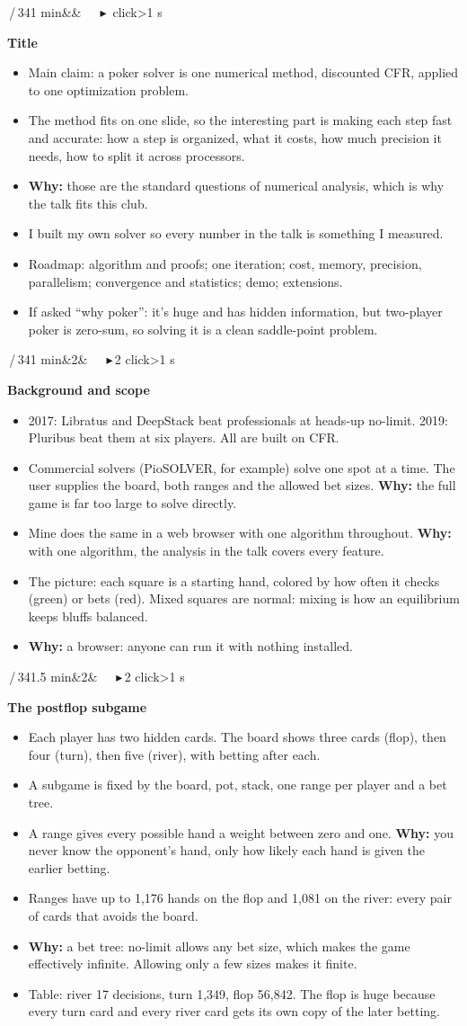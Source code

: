 \documentclass{article}
\newcommand{\slide}[4]{\clearpage
  \noindent\colorbox{bar}{\parbox{\dimexpr\linewidth-2\fboxsep}{\color{white}\fontsize{13}{15}\selectfont
  \textbf{\fontsize{21}{23}\selectfont #1}\,/\,34\hfill #3\ifx&#4&\else\ \ \ \textcolor{ck!40!white}{\ensuremath{\blacktriangleright}}\,#4 click\ifnum#4>1 s\fi\fi\\[2pt]
  \raggedright\textbf{\fontsize{15}{17.5}\selectfont #2}}}\par\vspace{5pt}
  \fontsize{15}{17.8}\selectfont\raggedright}
\newcommand{\pt}{\item[\textbullet]}
\newcommand{\ck}{\item[\textcolor{ck}{\ensuremath{\blacktriangleright}}]}
\newcommand{\why}{\textcolor{why}{\textbf{Why:}} }
\begin{document}
\slide{1}{Title}{1 min}{}
\begin{itemize}
\pt Main claim: a poker solver is one numerical method, discounted CFR, applied to one optimization problem.
\pt The method fits on one slide, so the interesting part is making each step fast and accurate: how a step is organized, what it costs, how much precision it needs, how to split it across processors.
\pt \why those are the standard questions of numerical analysis, which is why the talk fits this club.
\pt I built my own solver so every number in the talk is something I measured.
\pt Roadmap: algorithm and proofs; one iteration; cost, memory, precision, parallelism; convergence and statistics; demo; extensions.
\pt If asked ``why poker'': it's huge and has hidden information, but two-player poker is zero-sum, so solving it is a clean saddle-point problem.
\end{itemize}

\slide{2}{Background and scope}{1 min}{2}
\begin{itemize}
\pt 2017: Libratus and DeepStack beat professionals at heads-up no-limit. 2019: Pluribus beat them at six players. All are built on CFR.
\ck Commercial solvers (PioSOLVER, for example) solve one spot at a time. The user supplies the board, both ranges and the allowed bet sizes. \why the full game is far too large to solve directly.
\ck Mine does the same in a web browser with one algorithm throughout. \why with one algorithm, the analysis in the talk covers every feature.
\pt The picture: each square is a starting hand, colored by how often it checks (green) or bets (red). Mixed squares are normal: mixing is how an equilibrium keeps bluffs balanced.
\pt \why a browser: anyone can run it with nothing installed.
\end{itemize}

\slide{3}{The postflop subgame}{1.5 min}{2}
\begin{itemize}
\pt Each player has two hidden cards. The board shows three cards (flop), then four (turn), then five (river), with betting after each.
\ck A subgame is fixed by the board, pot, stack, one range per player and a bet tree.
\pt A range gives every possible hand a weight between zero and one. \why you never know the opponent's hand, only how likely each hand is given the earlier betting.
\pt Ranges have up to 1,176 hands on the flop and 1,081 on the river: every pair of cards that avoids the board.
\ck \why a bet tree: no-limit allows any bet size, which makes the game effectively infinite. Allowing only a few sizes makes it finite.
\pt Table: river 17 decisions, turn 1,349, flop 56,842. The flop is huge because every turn card and every river card gets its own copy of the later betting.
\end{itemize}
\end{document}
